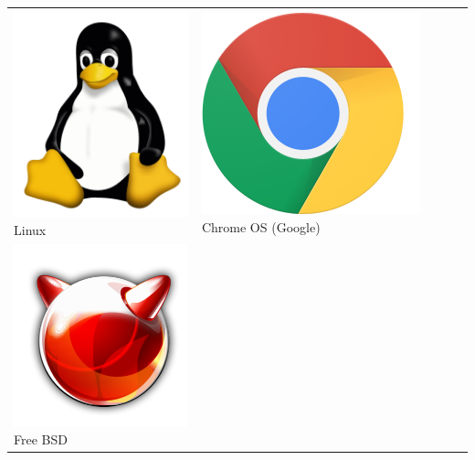 \documentclass{beamer}
\begin{document}
\begin{frame}
\begin{tabular}{ll}
	\includegraphics[height=.25\textheight]{..//img/Bweb01-environnement/tux.png} 
	Linux &
	\includegraphics[height=.25\textheight]{..//img/Bweb01-environnement/chrome.png} 
	Chrome OS (Google) \\
	
	\includegraphics[height=.25\textheight]{..//img/Bweb01-environnement/freebsd.png} 
	Free BSD &
	\\
	
\end{tabular}

\end{frame}
\end{document}
